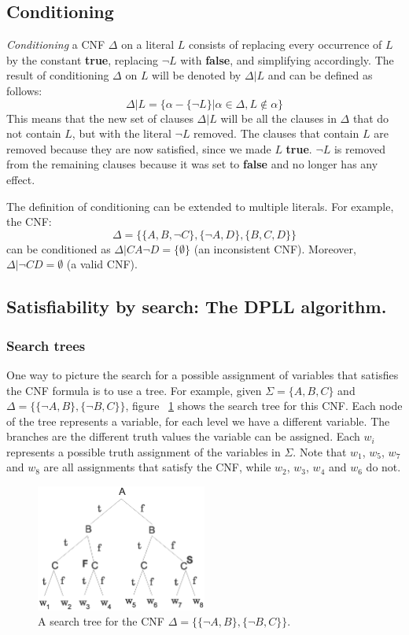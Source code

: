 \documentclass[12pt]{diicc}
\begin{document}
\subsection{Conditioning}
\textit{Conditioning} a CNF $\Delta$ on a literal $L$ consists of replacing every occurrence of $L$ by the constant \textbf{true}, replacing $\neg L$ with \textbf{false}, and simplifying accordingly. The result of conditioning $\Delta$ on $L$ will be denoted by $\Delta |L$ and can be defined as follows:
\[ \Delta |L=\{\alpha -\{\neg L\}|\alpha \in \Delta, L\notin \alpha\}\]
This means that the new set of clauses $\Delta |L$ will be all the clauses in $\Delta$ that do not contain $L$, but with the literal $\neg L$ removed. The clauses that contain $L$ are removed because they are now satisfied, since we made $L$ \textbf{true}. $\neg L$ is removed from the remaining clauses because it was set to \textbf{false} and no longer has any effect.

The definition of conditioning can be extended to multiple literals. For example, the CNF:
\[\Delta=\{\{A,B,\neg C\},\{\neg A,D\},\{B,C,D\}\}\]
can be conditioned as $\Delta |CA\neg D=\{\emptyset \}$ (an inconsistent CNF). Moreover, $\Delta |\neg CD=\emptyset$ (a valid CNF).

\subsection{Satisfiability by search: The DPLL algorithm.}

\subsubsection{Search trees}
One way to picture the search for a possible assignment of variables that satisfies the CNF formula is to use a tree. For example, given $\Sigma =\{A,B,C\}$ and $\Delta =\{\{\neg A,B\},\{\neg B,C\}\}$, figure ~\ref{fig:searchtree} shows the search tree for this CNF. Each node of the tree represents a variable, for each level we have a different variable. The branches are the different truth values the variable can be assigned. Each $w_{i}$ represents a possible truth assignment of the variables in $\Sigma$. Note that $w_{1}$, $w_{5}$, $w_{7}$ and $w_{8}$ are all assignments that satisfy the CNF, while $w_{2}$, $w_{3}$, $w_{4}$ and $w_{6}$ do not.

\begin{figure}[h!]
	\centering
		\includegraphics[width=0.5\textwidth]{searchtree}
	\caption{A search tree for the CNF $\Delta =\{\{\neg A,B\},\{\neg B,C\}\}$.}
	\label{fig:searchtree}
\end{figure}
\end{document}
